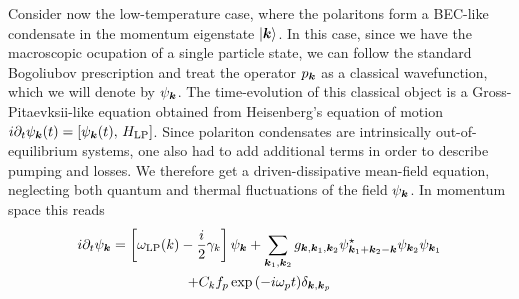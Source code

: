 Consider now the low-temperature case, where the polaritons form a
BEC-like condensate in the momentum eigenstate $\vert \bm{k} \rangle$. In this
case, since we have the macroscopic ocupation of a single particle
state, we can follow the standard Bogoliubov prescription and treat
the operator $p_{\bm{k}}$ as a classical wavefunction, which we will
denote by $\psi_{\bm{k}}$. The time-evolution of this classical object is
a Gross-Pitaevksii-like equation obtained from Heisenberg's equation
of motion
$i \partial_t \psi_{\bm{k}}(t) = \left[\psi_{\bm{k}}(t),\,
  H_{\text{LP}}\right]$.  Since polariton condensates are
intrinsically out-of-equilibrium systems, one also had to add
additional terms in order to describe pumping and losses. We therefore
get a driven-dissipative mean-field equation, neglecting both quantum
and thermal fluctuations of the field $\psi_{\bm{k}}$. In momentum space
this reads
%
\begin{multline}\label{eq:mom-GPE}
  i\partial_t\psi_{\bm{k}} = \left[\omega_{\text{LP}}(k) - \frac{i}{2} \gamma_k\right]\psi_{\bm{k}} + \sum_{\bm{k}_1,\bm{k}_2} g_{\bm{k},\bm{k}_1,\bm{k}_2} \psi^{\star}_{\bm{k}_1 + \bm{k}_2 - \bm{k}} \psi_{\bm{k}_2} \psi_{\bm{k}_1}\\
  + C_k f_p \exp{\left(-i \omega_pt\right)} \delta_{\bm{k},\bm{k}_{p}}
\end{multline}
% 










